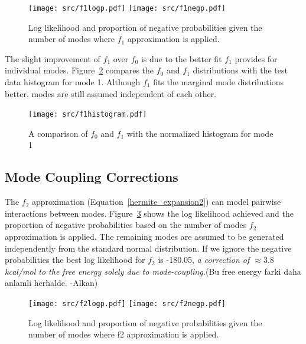 \documentclass{article}
\begin{document}

\begin{figure}[h]
  \texttt{[image: src/f1logp.pdf]}
  \texttt{[image: src/f1negp.pdf]}
\caption{Log likelihood and proportion of negative probabilities given
  the number of modes where $f_1$ approximation is applied.}
\label{fig:f1}
\end{figure}

The slight improvement of $f_1$ over $f_0$ is due to the better fit
$f_1$ provides for individual modes.  Figure~\ref{fig:f1histogram}
compares the $f_0$ and $f_1$ distributions with the test data
histogram for mode 1.  Although $f_1$ fits the marginal mode
distributions better, modes are still assumed independent of each
other.


\begin{figure}[h]\centering
  \texttt{[image: src/f1histogram.pdf]}
\caption{A comparison of $f_0$ and $f_1$ with the normalized histogram for
  mode 1}
\label{fig:f1histogram}
\end{figure}

\subsection{Mode Coupling Corrections} %


The $f_2$ approximation (Equation~\ref{hermite_expansion2}) can model
pairwise interactions between modes.  Figure~\ref{fig:f2} shows the
log likelihood achieved and the proportion of negative probabilities
based on the number of modes $f_2$ approximation is applied.  The
remaining modes are assumed to be generated independently from the
standard normal distribution.  If we ignore the negative probabilities
the best log likelihood for $f_2$ is -180.05, {\it a correction of
$\approx 3.8$ kcal/mol to the free energy solely due to
mode-coupling.}(Bu free energy farki daha anlamli herhalde. -Alkan)


\begin{figure}[h]
  \texttt{[image: src/f2logp.pdf]}
  \texttt{[image: src/f2negp.pdf]}
\caption{Log likelihood and proportion of negative probabilities given
  the number of modes where f2 approximation is applied.}
\label{fig:f2}
\end{figure}
\end{document}
